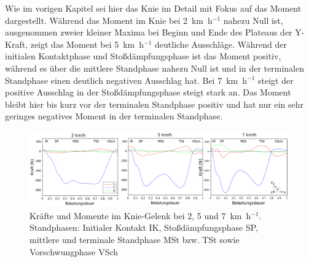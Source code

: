 Wie im vorigen Kapitel sei hier das Knie im Detail mit Fokus auf das Moment dargestellt.
Während das Moment im Knie bei 2~km~h$^{-1}$ nahezu Null ist, ausgenommen zweier kleiner Maxima bei Beginn und Ende des Plateaus der Y-Kraft, zeigt das Moment bei 5~km~h$^{-1}$ deutliche Ausschläge. Während der initialen Kontaktphase und Stoßdämpfungsphase ist das Moment positiv, während es über die mittlere Standphase nahezu Null ist und in der terminalen Standphase einen deutlich negativen Ausschlag hat. Bei 7~km~h$^{-1}$ steigt der positive Ausschlag in der Stoßdämpfungsphase steigt stark an. Das Moment bleibt hier bis kurz vor der terminalen Standphase positiv und hat nur ein sehr geringes negatives Moment in der terminalen Standphase.\\
\begin{figure}[h!]
	\centering
	\includegraphics[width=\linewidth]{bilder/Ergebnisse/comp_knee_mom}
	\caption{Kräfte und Momente im Knie-Gelenk bei 2, 5 und 7~km~h$^{-1}$. Standphasen: Initialer Kontakt IK, Stoßdämpfungsphase SP, mittlere und terminale Standphase MSt bzw. TSt sowie Vorschwungphase VSch}
	\label{fig:comp_knee_mom}
\end{figure}

